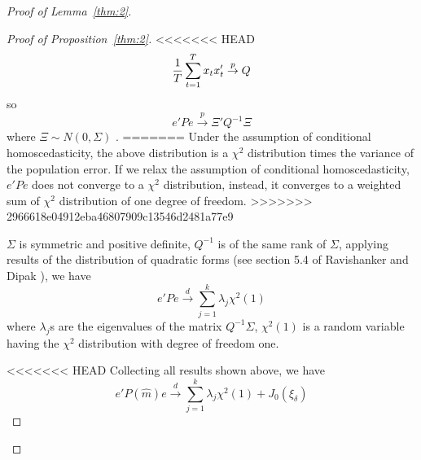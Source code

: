 \begin{proof}[Proof of Lemma~\ref{thm:2}]
\begin{proof}[Proof of Proposition~\ref{thm:2}]
<<<<<<< HEAD
    \begin{equation*}
      \frac{1}{T} \sum_{t=1}^{T} x_t x_t' \stackrel{p}{\rightarrow} Q
    \end{equation*}
so
    \begin{equation*}
      e'Pe \stackrel{p}{\rightarrow} \Xi' Q^{-1} \Xi
    \end{equation*}
where $\Xi \sim N(0, \Sigma)$ .
=======
Under the assumption of conditional homoscedasticity, the above distribution is a $\chi^2$ distribution times the variance of the population error. If we relax the assumption of conditional homoscedasticity, $e'Pe$ does not converge to a $\chi^2$ distribution, instead, it converges to a weighted sum of $\chi^2$ distribution of one degree of freedom.
>>>>>>> 2966618e04912eba46807909c13546d2481a77e9

\noindent $\Sigma$ is symmetric and positive definite, $Q^{-1}$ is of the same rank of $\Sigma$, applying results of the distribution of quadratic forms (see section 5.4 of Ravishanker and Dipak \cite{linear_model_textbook}), we have
    \begin{equation*}
      e'Pe \stackrel{d}{\rightarrow} \sum_{j=1}^{k} \lambda_j \chi^2(1)
    \end{equation*}
where $\lambda_j$s are the eigenvalues of the matrix $Q^{-1}\Sigma$, $\chi^2(1)$ is a random variable having the $\chi^2$ distribution with degree of freedom one. 

<<<<<<< HEAD
\noindent Collecting all results shown above, we have
    \begin{equation*}
      e'P(\hat{m})e \stackrel{d}{\rightarrow} \sum_{j=1}^{k} \lambda_j \chi^2(1) + J_0(\xi_{\delta})
    \end{equation*}
\end{proof}


\end{proof}
